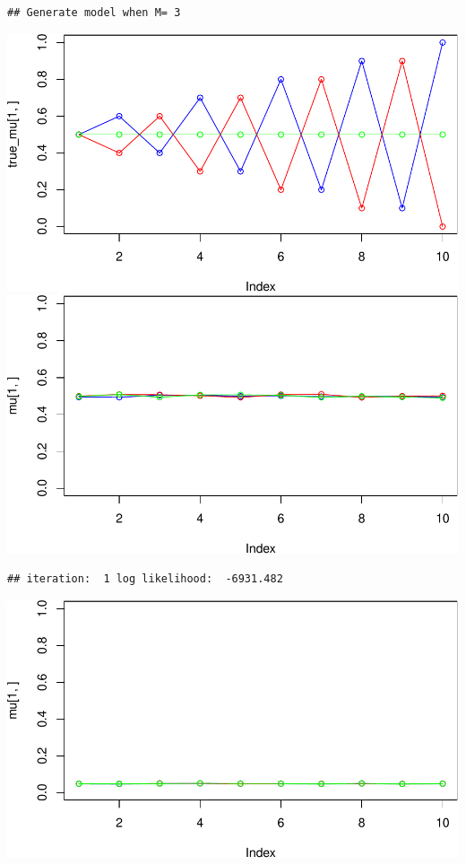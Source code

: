 \documentclass[
]{article}
\begin{document}
\begin{verbatim}
## Generate model when M= 3
\end{verbatim}

\includegraphics{Lab1Block2_files/figure-latex/unnamed-chunk-1-6.pdf}
\includegraphics{Lab1Block2_files/figure-latex/unnamed-chunk-1-7.pdf}

\begin{verbatim}
## iteration:  1 log likelihood:  -6931.482
\end{verbatim}

\includegraphics{Lab1Block2_files/figure-latex/unnamed-chunk-1-8.pdf}
\end{document}
